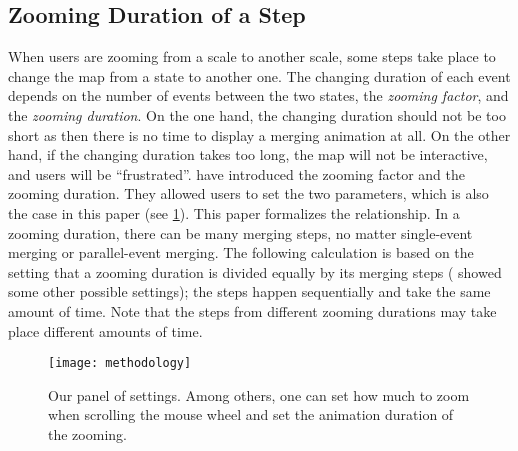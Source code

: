 \documentclass[ijgi,article,submit,moreauthors,pdftex]{Definitions/mdpi}
\begin{document}



\subsection{Zooming Duration of a Step}
\label{sec:zooming_duration}

When users are zooming from a scale to another scale,
some steps take place to change the map from a state to another one.
The changing duration of each event 
depends on the number of events between the two states,
the \emph{zooming factor}, and the \emph{zooming duration}.
On the one hand, the changing duration should not be too short 
as then there is no time to display a merging animation at all. 
On the other hand, if the changing duration takes too long, 
the map will not be interactive, and users will be ``frustrated''.
\citet[][]{Meijers2020Web} 
have introduced the zooming factor and the zooming duration.
They allowed users to set the two parameters,
which is also the case in this paper
(see \fig\ref{fig:interaction_settings}).
This paper formalizes the relationship.
In a zooming duration, there can be many merging steps,
no matter single-event merging or parallel-event merging.
The following calculation is based on the setting that
a zooming duration is divided equally by its merging steps
(\citet[][]{Suba2017Thesis} showed some other possible settings);
the steps happen sequentially and take the same amount of time.
Note that the steps from different zooming durations may take place different
amounts of time.

\begin{figure}[tb]
\centering
\texttt{[image: methodology]}
\caption{Our panel of settings. 
Among others, one can set how much to zoom when scrolling the mouse wheel 
and set the animation duration of the zooming.}
\label{fig:interaction_settings}
\end{figure}
\end{document}
